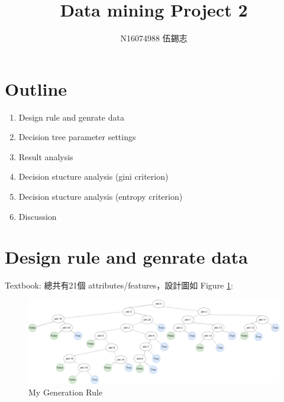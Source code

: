 \documentclass[8pt,a4paper]{article}
\begin{document}

\title{\bf{ Data mining Project 2 }}
\date{}
\author{N16074988 伍錫志}

\maketitle

\section*{Outline} 
\label{sec:Outline}

\begin{enumerate}
    \item Design rule and genrate data
    \item Decision tree parameter settings
    \item Result analysis
    \item Decision stucture analysis (gini criterion)
    \item Decision stucture analysis (entropy criterion)
    \item Discussion
\end{enumerate}

\section*{Design rule and genrate data} 
\label{sec:Design rule and genrate data}
Textbook:\cite{han2011data}
總共有21個 attributes/features，設計圖如 Figure \ref{fig:generation_rule}:
\begin{figure}[H]
    \begin{center}
        \includegraphics[width=500pt]{generation_rule.png}
        \caption{My Generation Rule}
        \label{fig:generation_rule}
    \end{center}
\end{figure}
\end{document}
